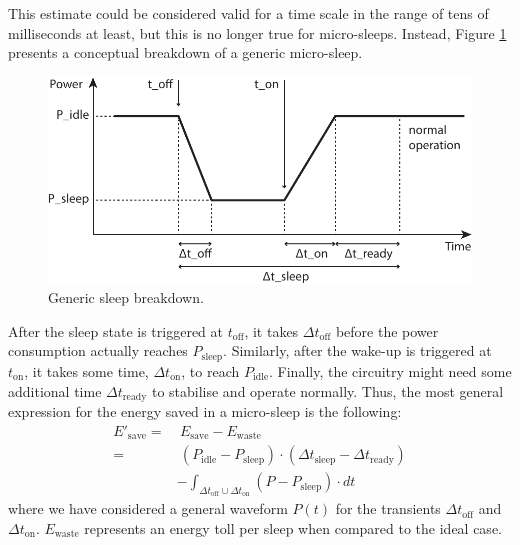 \documentclass[twoside,nohyper]{tufte-book}
\theoremstyle{definition}
\theoremstyle{definition}
\theoremstyle{definition}
\theoremstyle{remark}
\begin{document}
This estimate could be considered valid for a time scale in the range of
tens of milliseconds at least, but this is no longer true for
micro-sleeps. Instead, Figure \ref{fig:timing} presents a conceptual
breakdown of a generic micro-sleep.



\begin{figure}

{\centering \includegraphics{img/05/timing} 

}

\caption[Generic sleep breakdown.]{Generic sleep breakdown.}\label{fig:timing}
\end{figure}

After the sleep state is triggered at \(t_\mathrm{off}\), it takes
\(\Delta t_\mathrm{off}\) before the power consumption actually reaches
\(P_\mathrm{sleep}\). Similarly, after the wake-up is triggered at
\(t_\mathrm{on}\), it takes some time, \(\Delta t_\mathrm{on}\), to
reach \(P_\mathrm{idle}\). Finally, the circuitry might need some
additional time \(\Delta t_\mathrm{ready}\) to stabilise and operate
normally. Thus, the most general expression for the energy saved in a
micro-sleep is the following:
%
\begin{equation}
\begin{split}
 E'_\mathrm{save} =&~ E_\mathrm{save} - E_\mathrm{waste} \\
 =&~ (P_\mathrm{idle} - P_\mathrm{sleep}) \cdot (\Delta t_\mathrm{sleep} -\Delta t_\mathrm{ready}) \\
 &- \int_{\Delta t_\mathrm{off} \cup \Delta t_\mathrm{on}} (P - P_\mathrm{sleep}) \cdot dt
\end{split}
\label{eq:realsleep}
\end{equation}
%
where we have considered a general waveform \(P(t)\) for the transients
\(\Delta t_\mathrm{off}\) and \(\Delta t_\mathrm{on}\).
\(E_\mathrm{waste}\) represents an energy toll per sleep when compared
to the ideal case.
\end{document}

